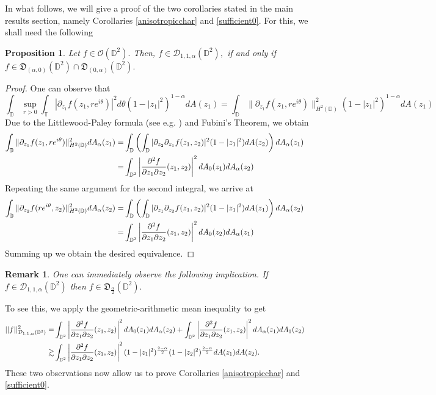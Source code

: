 \documentclass[11pt]{amsart}
\newtheorem{proposition}[theorem]{Proposition}
\newtheorem{remark}[theorem]{Remark}
\numberwithin{equation}{section}
\begin{document}
In what follows, we will give a proof of the two corollaries stated in the main results section, namely Corollaries \ref{anisotropicchar} and \ref{sufficient0}. For this, we shall need the following  
\begin{proposition} Let $f\in \mathcal{O}(\mathbb{D}^2).$ Then, $f\in \mathcal{D}_{1,1,\alpha}(\mathbb{D}^2),$ if and only if $f\in \mathfrak{D}_{(\alpha,0)}(\mathbb{D}^2)\cap\mathfrak{D}_{(0,\alpha)}(\mathbb{D}^2).$
\label{claDir}
\end{proposition}
\begin{proof}
One can observe that
$$\int_{\mathbb{D}}\sup_{r>0}\int_{\mathbb{T}}|\partial_{z_1}f(z_1,re^{i\theta})|^2d\theta(1-|z_1|^2)^{1-\alpha} dA(z_1)=\int_{\mathbb{D}}\|\partial_{z_1}f(z_1,re^{i\theta})\|^2_{H^2(\mathbb{D})}(1-|z_1|^2)^{1-\alpha}dA(z_1)$$
Due to the Littlewood-Paley formula (see e.g. \cite{Yama}) and Fubini's Theorem, we obtain
\begin{align}
\int_{\mathbb{D}}\|\partial_{z_1}f(z_1,re^{i\theta})\|^2_{H^2(\mathbb{D})}dA_{\alpha}(z_1)=&\int_{\mathbb{D}}\left(\int_{\mathbb{D}}|\partial_{z_2}\partial_{z_1}f(z_1,z_2)|^2(1-|z_1|^2)dA(z_2)\right)dA_{\alpha}(z_1) \notag &&\\
=&\int_{\mathbb{D}^2}\left|\frac{\partial^2 f}{\partial z_1 \partial z_2}(z_1,z_2)\right|^2dA_{0}(z_1)dA_{\alpha}(z_2)
\end{align}
Repeating the same argument for the second integral, we arrive at
\begin{align}
\int_{\mathbb{D}}\|\partial_{z_2}f(re^{i\theta},z_2)\|^2_{H^2(\mathbb{D})}dA_{\alpha}(z_2)=&\int_{\mathbb{D}}\left(\int_{\mathbb{D}}|\partial_{z_1}\partial_{z_2}f(z_1,z_2)|^2(1-|z_1|^2)dA(z_1)\right)dA_{\alpha}(z_2) \notag &&\\
=&\int_{\mathbb{D}^2}\left|\frac{\partial^2 f}{\partial z_1 \partial z_2}(z_1,z_2)\right|^2dA_{0}(z_2)dA_{\alpha}(z_1)
\end{align}
Summing up we obtain the desired equivalence. 
\end{proof}
\begin{remark} One can immediately observe the following implication. If
$f\in \mathcal{D}_{1,1,\alpha}(\mathbb{D}^2)$ then $f\in \mathfrak{D}_{\frac{\alpha}{2}}(\mathbb{D}^2).$
\end{remark}
To see this, we apply the geometric-arithmetic mean inequality to get
\begin{align}
||f||^2_{\mathcal{D}_{1,1,\alpha}(\mathbb{D}^2)}=&\int_{\mathbb{D}^2}\left|\frac{\partial^2 f}{\partial z_1 \partial z_2}(z_1,z_2)\right|^2dA_{0}(z_1)dA_{\alpha}(z_2)+\int_{\mathbb{D}^2}\left|\frac{\partial^2 f}{\partial z_1 \partial z_2}(z_1,z_2)\right|^2dA_{\alpha}(z_1)dA_{1}(z_2) &&\\
\gtrsim&\int_{\mathbb{D}^2}\left|\frac{\partial^2 f}{\partial z_1 \partial z_2}(z_1,z_2)\right|^2(1-|z_1|^2)^{\frac{2-\alpha}{2}}(1-|z_2|^2)^{\frac{2-\alpha}{2}}dA(z_1)dA(z_2) \notag .
\end{align}
These two observations now allow us to prove Corollaries \ref{anisotropicchar} and \ref{sufficient0}.
\end{document}
